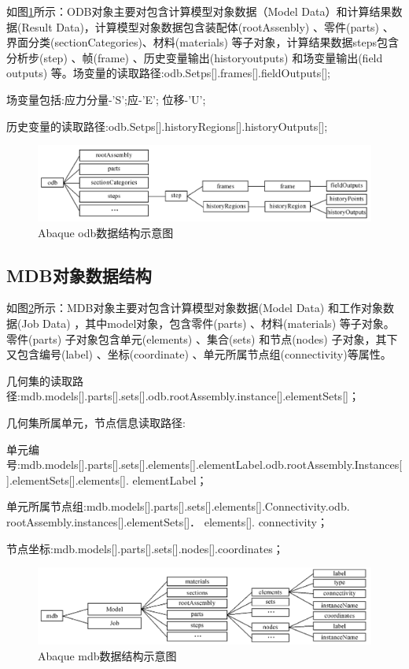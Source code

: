 \documentclass[forprint]{WHUBachelor}
\begin{document}
如图\ref{4-2}所示：ODB对象主要对包含计算模型对象数据（Model Data）和计算结果数据(Result Data)，计算模型对象数据包含装配体(rootAssenbly)
、零件(parts) 、界面分类(sectionCategories)、材料(materials) 等子对象，计算结果数据steps包含分析步(step)
、帧(frame) 、历史变量输出(historyoutputs) 和场变量输出(field outputs) 等。场变量的读取路径:odb.Setps{[}{]}.frames{[}{]}.fieldOutputs{[}{]};

场变量包括:应力分量-'S';应-'E'; 位移-'U';

历史变量的读取路径:odb.Setps{[}{]}.historyRegions{[}{]}.historyOutputs{[}{]};

\begin{figure}[H]
\centering  
\includegraphics[width = .8\textwidth]{2.png} 
\caption{Abaque odb数据结构示意图} 
\label{4-2} 
\end{figure}

\subsection{MDB对象数据结构}

如图\ref{4-3}所示：MDB对象主要对包含计算模型对象数据(Model Data) 和工作对象数据(Job Data) ，其中model对象，包含零件(parts)
、材料(materials) 等子对象。零件(parts) 子对象包含单元(elements) 、集合(sets) 和节点(nodes)
子对象，其下又包含编号(label) 、坐标(coordinate) 、单元所属节点组(connectivity)等属性。

几何集的读取路径:mdb.models{[}{]}.parts{[}{]}.sets{[}{]}.odb.rootAssembly.instance{[}{]}.elementSets{[}{]}；

几何集所属单元，节点信息读取路径:

单元编号:mdb.models{[}{]}.parts{[}{]}.sets{[}{]}.elements{[}{]}.elementLabel.odb.rootAssembly.Instances{[}{]}.elementSets{[}{]}.elements{[}{]}.
elementLabel；

单元所属节点组:mdb.models{[}{]}.parts{[}{]}.sets{[}{]}.elements{[}{]}.Connectivity.odb.
rootAssembly.instances{[}{]}.elementSets{[}{]}． elements{[}{]}. connectivity；

节点坐标:mdb.models{[}{]}.parts{[}{]}.sets{[}{]}.nodes{[}{]}.coordinates；

\begin{figure}[H]
\centering  
\includegraphics[width = .8\textwidth]{3.png} 
\caption{Abaque mdb数据结构示意图} 
\label{4-3} 
\end{figure}
\end{document}
